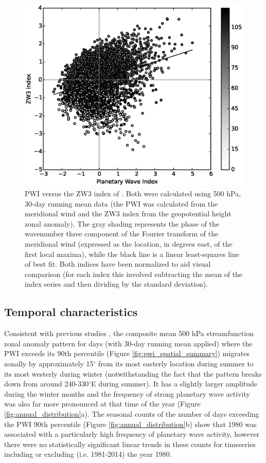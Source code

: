 \begin{figure}
\begin{center}
\includegraphics[width=0.7\columnwidth]{figures/zonalwaves/pwi-vs-zw3index_ERAInterim_500hPa_030day-runmean_native.eps}
\caption{\label{fig:metric_vs_zw3}
PWI versus the ZW3 index of \citet{Raphael2004}. Both were calculated using 500 hPa, 30-day running mean data (the PWI was calculated from the meridional wind and the ZW3 index from the geopotential height zonal anomaly). The gray shading represents the phase of the wavenumber three component of the Fourier transform of the meridional wind (expressed as the location, in degrees east, of the first local maxima), while the black line is a linear least-squares line of best fit. Both indices have been normalized to aid visual comparison (for each index this involved subtracting the mean of the index series and then dividing by the standard deviation).}
\end{center}
\end{figure}
    
\subsection{Temporal characteristics}

Consistent with previous studies \citep[e.g.][]{vanLoon1984,Mo1985}, the composite mean 500 hPa streamfunction zonal anomaly pattern for days (with 30-day running mean applied) where the PWI exceeds its 90th percentile (Figure \ref{fig:pwi_spatial_summary}) migrates zonally by approximately 15$^{\circ}$ from its most easterly location during summer to its most westerly during winter (notwithstanding the fact that the pattern breaks down from around 240-330$^{\circ}$E during summer). It has a slightly larger amplitude during the winter months and the frequency of strong planetary wave activity was also far more pronounced at that time of the year (Figure \ref{fig:annual_distribution}a). The seasonal counts of the number of days exceeding the PWI 90th percentile (Figure \ref{fig:annual_distribution}b) show that 1980 was associated with a particularly high frequency of planetary wave activity, however there were no statistically significant linear trends in these counts for timeseries including or excluding (i.e. 1981-2014) the year 1980.  

